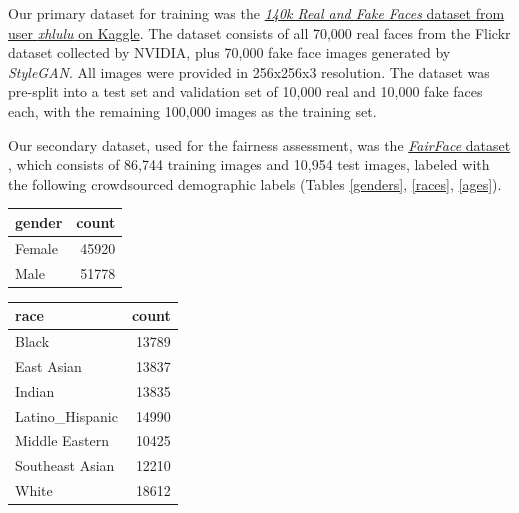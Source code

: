 \documentclass[11pt, letterpaper]{article}
\newenvironment{Figure}
  {\par\medskip\noindent\minipage{\linewidth}}
  {\endminipage\par\medskip}
\begin{document}
\begin{multicols}{2}
  Our primary dataset for training was the
  \href{https://www.kaggle.com/xhlulu/140k-real-and-fake-faces}{\emph{140k
    Real and Fake Faces} dataset from user \emph{xhlulu} on
    Kaggle}. The dataset consists of all 70,000 real faces from the
  Flickr dataset collected by NVIDIA, plus 70,000 fake face images
  generated by \emph{StyleGAN}. All images were provided in 256x256x3
  resolution. The dataset was pre-split into a test set and validation
  set of 10,000 real and 10,000 fake faces each, with the remaining
  100,000 images as the training set.

  Our secondary dataset, used for the fairness assessment, was the
  \href{https://github.com/joojs/fairface}{\emph{FairFace} dataset}
  \cite{karkkainen2019fairface}, which consists of 86,744 training
  images and 10,954 test images, labeled with the following
  crowdsourced demographic labels (Tables \ref{genders}, \ref{races},
  \ref{ages}).

  \begin{Figure}
    \label{genders}
  \begin{tabular}{lr}
    \toprule
        gender &  count  \\
        \midrule
        Female &  45920 \\
        Male   &  51778 \\
        \bottomrule
  \end{tabular}
  \end{Figure}

  \begin{Figure}
    \label{races}
  \begin{tabular}{lr}
    \toprule
        race            &  count \\
        \midrule
        Black           &  13789 \\
        East Asian      &  13837 \\
        Indian          &  13835 \\
        Latino\_Hispanic &  14990 \\
        Middle Eastern  &  10425 \\
        Southeast Asian &  12210 \\
        White           &  18612 \\
        \bottomrule
  \end{tabular}
  \end{Figure}


\end{multicols}
\end{document}
